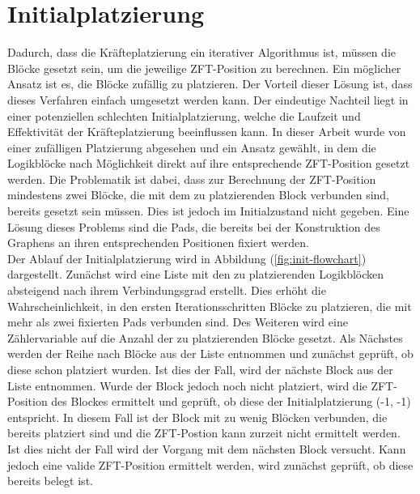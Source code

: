     
        
    \section{Initialplatzierung}\label{sec:init}
        Dadurch, dass die Kräfteplatzierung ein iterativer Algorithmus ist,
        müssen die Blöcke gesetzt sein, um die jeweilige ZFT-Position zu berechnen.
        Ein möglicher Ansatz ist es, die Blöcke zufällig zu platzieren.
        Der Vorteil dieser Lösung ist, dass dieses Verfahren einfach umgesetzt werden kann.
        Der eindeutige Nachteil liegt in einer potenziellen schlechten Initialplatzierung,
        welche die Laufzeit und Effektivität der Kräfteplatzierung beeinflussen kann.
        In dieser Arbeit wurde von einer zufälligen Platzierung abgesehen und ein Ansatz gewählt,
        in dem die Logikblöcke nach Möglichkeit direkt auf ihre entsprechende ZFT-Position gesetzt werden.
        Die Problematik ist dabei, dass zur Berechnung der ZFT-Position mindestens zwei Blöcke,
        die mit dem zu platzierenden Block verbunden sind, bereits gesetzt sein müssen.
        Dies ist jedoch im Initialzustand nicht gegeben. Eine Lösung dieses Problems sind die Pads,
        die bereits bei der Konstruktion des Graphens an ihren entsprechenden Positionen fixiert werden.
        \\
        Der Ablauf der Initialplatzierung wird in Abbildung (\ref{fig:init-flowchart}) dargestellt.
        Zunächst wird eine Liste mit den zu platzierenden Logikblöcken absteigend nach ihrem
        Verbindungsgrad erstellt. Dies erhöht die Wahrscheinlichkeit, in den ersten
        Iterationsschritten Blöcke zu platzieren, die mit mehr als zwei fixierten Pads verbunden sind.
        Des Weiteren wird eine Zählervariable auf die Anzahl der zu platzierenden Blöcke gesetzt.
        Als Nächstes werden der Reihe nach Blöcke aus der Liste entnommen und zunächst geprüft,
        ob diese schon platziert wurden. Ist dies der Fall, wird der nächste Block aus der Liste entnommen.
        Wurde der Block jedoch noch nicht platziert, wird die ZFT-Position des Blockes ermittelt und geprüft,
        ob diese der Initialplatzierung (-1, -1) entspricht. In diesem Fall ist der Block mit zu wenig
        Blöcken verbunden, die bereits platziert sind und die ZFT-Postion kann zurzeit nicht ermittelt werden. 
        Ist dies nicht der Fall wird der Vorgang mit dem nächsten Block versucht. Kann jedoch eine valide
        ZFT-Position ermittelt werden, wird zunächst geprüft, ob diese bereits belegt ist.
